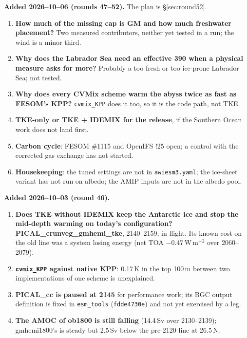 \documentclass[10pt]{article}
\begin{document}
\textbf{Added 2026--10--06 (rounds 47--52).} The plan is \S\ref{sec:round52}.
\begin{enumerate}\itemsep2pt
\item \textbf{How much of the missing cap is GM and how much freshwater placement?} Two measured
contributors, neither yet tested in a run; the wind is a minor third.
\item \textbf{Why does the Labrador Sea need an effective 390 when a physical measure asks for
more?} Probably a too fresh or too ice-prone Labrador Sea; not tested.
\item \textbf{Why does every CVMix scheme warm the abyss twice as fast as FESOM's KPP?}
\texttt{cvmix\_KPP} does it too, so it is the code path, not TKE.
\item \textbf{TKE-only or TKE + IDEMIX for the release}, if the Southern Ocean work does not land
first.
\item \textbf{Carbon cycle}: FESOM \#1115 and OpenIFS !25 open; a control with the corrected gas
exchange has not started.
\item \textbf{Housekeeping}: the tuned settings are not in \texttt{awiesm3.yaml}; the ice-sheet
variant has not run on albedo; the AMIP inputs are not in the albedo pool.
\end{enumerate}

\textbf{Added 2026--10--03 (round 46).}
\begin{enumerate}\itemsep2pt
\item \textbf{Does TKE without IDEMIX keep the Antarctic ice and stop the mid-depth warming on
today's configuration?} \textbf{PICAL\_crunveg\_gmhemi\_tke}, 2140--2159, in flight. Its known cost
on the old line was a system losing energy (net TOA $-0.47$\,W\,m$^{-2}$ over 2060--2079).
\item \textbf{\texttt{cvmix\_KPP} against native KPP}: 0.17\,K in the top 100\,m between two
implementations of one scheme is unexplained.
\item \textbf{PICAL\_cc is paused at 2145} for performance work; its BGC output definition is fixed in
\texttt{esm\_tools} (\texttt{fdde4730e}) and not yet exercised by a leg.
\item \textbf{The AMOC of ob1800 is still falling} (14.4\,Sv over 2130--2139); gmhemi1800's is
steady but 2.5\,Sv below the pre-2120 line at 26.5\,N.
\end{enumerate}
\end{document}
